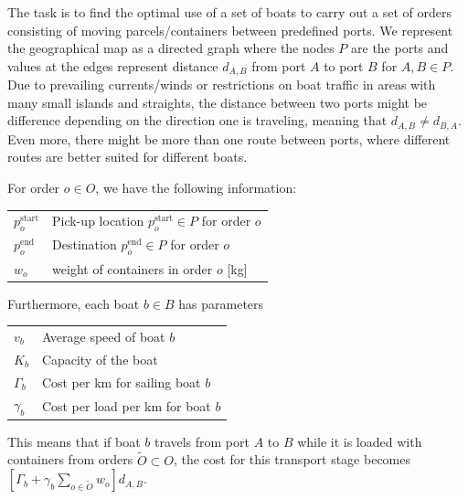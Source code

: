 \documentclass{article}
\begin{document}
The task is to find the optimal use of a set of boats to carry out a set of orders consisting of moving parcels/containers between predefined ports.
We represent the geographical map as a directed graph where the nodes $P$ are the ports and values at the edges represent distance $d_{A,B}$ from port $A$ to port $B$ for $A, B \in P$. Due to prevailing currents/winds or restrictions on boat traffic in areas with many small islands and straights, the distance between two ports might be difference depending on the direction one is traveling, meaning that $d_{A, B} \neq d_{B, A}$. Even more, there might be more than one route between ports, where different routes are better suited for different boats.



For order $o \in O$, we have the following information:

\begin{tabular}{ll}
    $p^{\text{start}}_o$ & Pick-up location $p^{\text{start}}_o \in P$ for order $o$ \\
    $p^{\text{end}}_o$ & Destination $p^{\text{end}}_o \in P$ for order $o$ \\
    $w_o$ & weight of containers in order $o$ [kg]
\end{tabular}
\vspace{1em}


\noindent Furthermore, each boat $b \in B$ has parameters

\begin{tabular}{ll}
    $v_b$ & Average speed of boat $b$ \\
    $K_b$ & Capacity of the boat   \\
    $\Gamma_b$ & Cost per km for sailing boat $b$ \\
    $\gamma_b$ & Cost per load per km for boat $b$ 
\end{tabular}
\vspace{1em}

\noindent This means that if boat $b$ travels from port $A$ to $B$ while it is loaded with containers from orders $\tilde{O} \subset O$, the cost for this transport stage becomes $\left[ \Gamma_b + \gamma_b\sum_{o \in \tilde{O}} w_o\right] d_{A,B}$.
\end{document}
